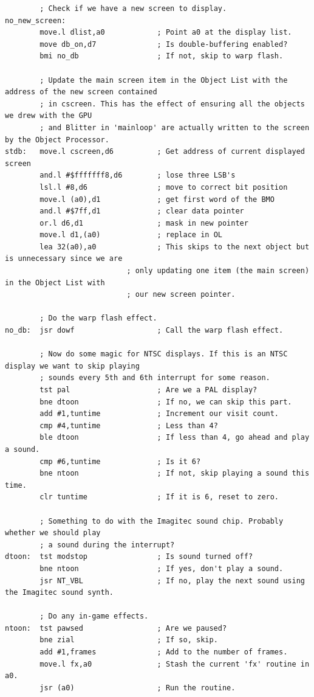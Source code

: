 \begin{lstlisting}
        ; Check if we have a new screen to display.
no_new_screen:
        move.l dlist,a0            ; Point a0 at the display list.
        move db_on,d7              ; Is double-buffering enabled?
        bmi no_db                  ; If not, skip to warp flash.
    
        ; Update the main screen item in the Object List with the address of the new screen contained
        ; in cscreen. This has the effect of ensuring all the objects we drew with the GPU
        ; and Blitter in 'mainloop' are actually written to the screen by the Object Processor.
stdb:   move.l cscreen,d6          ; Get address of current displayed screen
        and.l #$fffffff8,d6        ; lose three LSB's
        lsl.l #8,d6                ; move to correct bit position
        move.l (a0),d1             ; get first word of the BMO
        and.l #$7ff,d1             ; clear data pointer
        or.l d6,d1                 ; mask in new pointer
        move.l d1,(a0)             ; replace in OL
        lea 32(a0),a0              ; This skips to the next object but is unnecessary since we are
                            ; only updating one item (the main screen) in the Object List with
                            ; our new screen pointer.
    
        ; Do the warp flash effect.
no_db:  jsr dowf                   ; Call the warp flash effect.
    
        ; Now do some magic for NTSC displays. If this is an NTSC display we want to skip playing
        ; sounds every 5th and 6th interrupt for some reason.
        tst pal                    ; Are we a PAL display?
        bne dtoon                  ; If no, we can skip this part.
        add #1,tuntime             ; Increment our visit count.
        cmp #4,tuntime             ; Less than 4?
        ble dtoon                  ; If less than 4, go ahead and play a sound.
        cmp #6,tuntime             ; Is it 6?
        bne ntoon                  ; If not, skip playing a sound this time.
        clr tuntime                ; If it is 6, reset to zero.
    
        ; Something to do with the Imagitec sound chip. Probably whether we should play
        ; a sound during the interrupt?
dtoon:  tst modstop                ; Is sound turned off?
        bne ntoon                  ; If yes, don't play a sound.
        jsr NT_VBL                 ; If no, play the next sound using the Imagitec sound synth.
    
        ; Do any in-game effects.
ntoon:  tst pawsed                 ; Are we paused?
        bne zial                   ; If so, skip.
        add #1,frames              ; Add to the number of frames.
        move.l fx,a0               ; Stash the current 'fx' routine in a0.
        jsr (a0)                   ; Run the routine.
    

\end{lstlisting}
